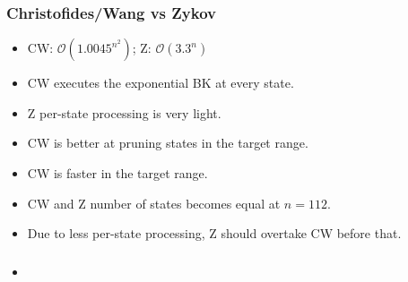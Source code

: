 \documentclass{beamer}
\newcommand{\BO}{\mathcal{O}}
\begin{document}
\begin{frame}
  \frametitle{Christofides/Wang vs Zykov}
  \begin{itemize}
  \item CW: \(\BO(1.0045^{n^2})\); Z: \(\BO(3.3^n)\)
  \item CW executes the exponential BK at every state.
  \item Z per-state processing is very light.
  \item CW is better at pruning states in the target range.
  \item CW is faster in the target range.
  \item CW and Z number of states becomes equal at \(n=112\).
  \item Due to less per-state processing, Z should overtake CW before that.
  \end{itemize}
\end{frame}

\begin{frame}
  \frametitle{}
  \begin{itemize}
  \item
  \end{itemize}
\end{frame}
\end{document}
